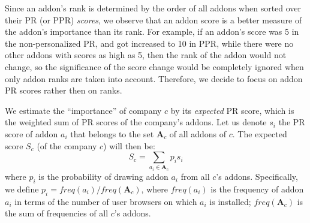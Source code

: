 \documentclass[ijoc,nonblindrev]{informs3} %
\numberwithin{equation}{subsection}
\begin{document}
Since an addon's rank is determined by the order of all addons when sorted over their PR (or PPR) \emph{scores}, we observe that an addon score is a better measure of the addon's importance than its rank. For example, if an addon's score was 5 in the non-personalized PR, and got increased to 10 in PPR, while there were no other addons with scores as high as 5, then the rank of the addon would not change, so the significance of the score change would be completely ignored when only addon ranks are taken into account. Therefore, we decide to focus on addon PR scores rather then on ranks. 

We estimate the ``importance'' of company $c$ by its \emph{expected} PR score, which is the weighted sum of PR scores of the company's addons. Let us denote $s_i$ the PR score of addon $a_i$ that belongs to the set $\mathbf{A}_c$ of all addons of $c$. The expected score $S_c$ (of the company $c$) will then be:
$$
S_c = \sum_{a_i \in \mathbf{A}_c} p_i s_i
$$
where $p_i$ is the probability of drawing addon $a_i$ from all $c$'s addons. Specifically, we define $p_i = freq(a_i) / freq(\mathbf{A}_c)$, where $freq(a_i)$ is the frequency of addon $a_i$ in terms of the number of user browsers on which $a_i$ is installed; $freq(\mathbf{A}_c)$ is the sum of frequencies of all $c$'s addons.
\end{document}
